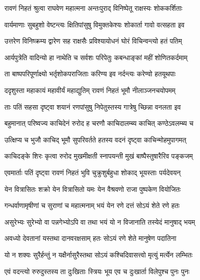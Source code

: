 
\twolineshloka
{रावणं निहतं श्रुत्वा राघवेण महात्मना}
{अन्तःपुराद् विनिष्पेतू राक्षस्यः शोककर्शिताः} %

\twolineshloka
{वार्यमाणाः सुबहुशो वेष्टन्त्यः क्षितिपांसुषु}
{विमुक्तकेश्यः शोकार्ता गावो वत्सहता इव} %

\twolineshloka
{उत्तरेण विनिष्क्रम्य द्वारेण सह राक्षसैः}
{प्रविश्यायोधनं घोरं विचिन्वन्त्यो हतं पतिम्} %

\twolineshloka
{आर्यपुत्रेति वादिन्यो हा नाथेति च सर्वशः}
{परिपेतुः कबन्धाङ्कां महीं शोणितकर्दमाम्} %

\twolineshloka
{ता बाष्पपरिपूर्णाक्ष्यो भर्तृशोकपराजिताः}
{करिण्य इव नर्दन्त्यः करेण्वो हतयूथपाः} %

\twolineshloka
{ददृशुस्ता महाकायं महावीर्यं महाद्युतिम्}
{रावणं निहतं भूमौ नीलाञ्जनचयोपमम्} %

\twolineshloka
{ताः पतिं सहसा दृष्ट्वा शयानं रणपांसुषु}
{निपेतुस्तस्य गात्रेषु च्छिन्ना वनलता इव} %

\twolineshloka
{बहुमानात् परिष्वज्य काचिदेनं रुरोद ह}
{चरणौ काचिदालम्ब्य काचित् कण्ठेऽवलम्ब्य च} %

\twolineshloka
{उत्क्षिप्य च भुजौ काचिद् भूमौ सुपरिवर्तते}
{हतस्य वदनं दृष्ट्वा काचिन्मोहमुपागमत्} %

\twolineshloka
{काचिदङ्के शिरः कृत्वा रुरोद मुखमीक्षती}
{स्नापयन्ती मुखं बाष्पैस्तुषारैरिव पङ्कजम्} %

\twolineshloka
{एवमार्ताः पतिं दृष्ट्वा रावणं निहतं भुवि}
{चुक्रुशुर्बहुधा शोकाद् भूयस्ताः पर्यदेवयन्} %

\twolineshloka
{येन वित्रासितः शक्रो येन वित्रासितो यमः}
{येन वैश्रवणो राजा पुष्पकेण वियोजितः} %

\twolineshloka
{गन्धर्वाणामृषीणां च सुराणां च महात्मनाम्}
{भयं येन रणे दत्तं सोऽयं शेते रणे हतः} %

\twolineshloka
{असुरेभ्यः सुरेभ्यो वा पन्नगेभ्योऽपि वा तथा}
{भयं यो न विजानाति तस्येदं मानुषाद् भयम्} %

\twolineshloka
{अवध्यो देवतानां यस्तथा दानवरक्षसाम्}
{हतः सोऽयं रणे शेते मानुषेण पदातिना} %

\twolineshloka
{यो न शक्यः सुरैर्हन्तुं न यक्षैर्नासुरैस्तथा}
{सोऽयं कश्चिदिवासत्त्वो मृत्युं मर्त्येन लम्भितः} %

\twolineshloka
{एवं वदन्त्यो रुरुदुस्तस्य ता दुःखिताः स्त्रियः}
{भूय एव च दुःखार्ता विलेपुश्च पुनः पुनः} %

